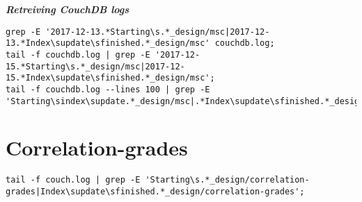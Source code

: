 \textit{\textbf{Retreiving CouchDB logs}}
\begin{verbatim}
grep -E '2017-12-13.*Starting\s.*_design/msc|2017-12-13.*Index\supdate\sfinished.*_design/msc' couchdb.log;
tail -f couchdb.log | grep -E '2017-12-15.*Starting\s.*_design/msc|2017-12-15.*Index\supdate\sfinished.*_design/msc';
tail -f couchdb.log --lines 100 | grep -E 'Starting\sindex\supdate.*_design/msc|.*Index\supdate\sfinished.*_design/msc'
\end{verbatim}


\section{Correlation-grades}
\begin{verbatim}
tail -f couch.log | grep -E 'Starting\s.*_design/correlation-grades|Index\supdate\sfinished.*_design/correlation-grades';
\end{verbatim}

